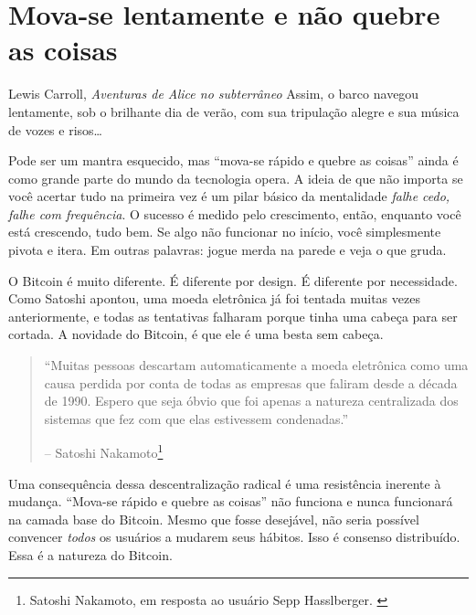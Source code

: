 \chapter{Mova-se lentamente e não quebre as coisas}
\label{les:18}

\begin{chapquote}{Lewis Carroll, \textit{Aventuras de Alice no subterrâneo}}
Assim, o barco navegou lentamente, sob o brilhante dia de verão, com sua tripulação alegre e sua música de vozes e risos\ldots
\end{chapquote}

Pode ser um mantra esquecido, mas \enquote{mova-se rápido e quebre as coisas} ainda é como grande parte do mundo da tecnologia opera. A ideia de que não importa se você acertar tudo na primeira vez é um pilar básico da mentalidade \textit{falhe cedo, falhe com frequência}. O sucesso é medido pelo crescimento, então, enquanto você está crescendo, tudo bem. Se algo não funcionar no início, você simplesmente pivota e itera. Em outras palavras: jogue merda na parede e veja o que gruda.

O Bitcoin é muito diferente. É diferente por design. É diferente por necessidade. Como Satoshi apontou, uma moeda eletrônica já foi tentada muitas vezes anteriormente, e todas as tentativas falharam porque tinha uma cabeça para ser cortada. A novidade do Bitcoin, é que ele é uma besta sem cabeça.

\begin{quotation}\begin{samepage}
\enquote{Muitas pessoas descartam automaticamente a moeda eletrônica como uma causa perdida por conta de todas as empresas que faliram desde a década de 1990. Espero que seja óbvio que foi apenas a natureza centralizada dos sistemas que fez com que elas estivessem condenadas.}
\begin{flushright} -- Satoshi Nakamoto\footnote{Satoshi Nakamoto, em resposta ao usuário Sepp Hasslberger. \cite{satoshi-centralized-nature}}
\end{flushright}\end{samepage}\end{quotation}

Uma consequência dessa descentralização radical é uma resistência inerente à mudança. \enquote{Mova-se rápido e quebre as coisas} não funciona e nunca funcionará na camada base do Bitcoin. Mesmo que fosse desejável, não seria possível convencer \textit{todos} os usuários a mudarem seus hábitos. Isso é consenso distribuído. Essa é a natureza do Bitcoin.

